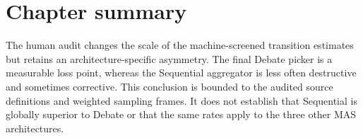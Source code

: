\section{Chapter summary}

The human audit changes the scale of the machine-screened transition estimates but retains an architecture-specific asymmetry. The final Debate picker is a measurable loss point, whereas the Sequential aggregator is less often destructive and sometimes corrective. This conclusion is bounded to the audited source definitions and weighted sampling frames. It does not establish that Sequential is globally superior to Debate or that the same rates apply to the three other MAS architectures.
